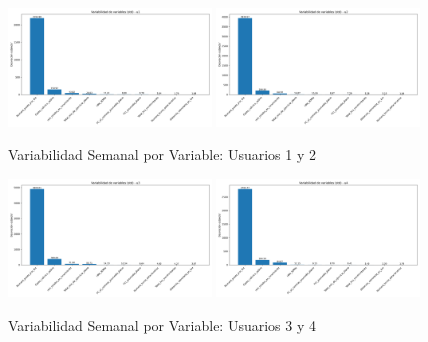 \documentclass[12pt,letterpaper,twoside]{report}
\begin{document}
\begin{figure}[H]
\centering
\includegraphics[width=0.48\textwidth]{figuras/variabilidad_variables_u1.png}
\includegraphics[width=0.48\textwidth]{figuras/variabilidad_variables_u2.png}
\caption{Variabilidad Semanal por Variable: Usuarios 1 y 2}
\end{figure}

\begin{figure}[H]
\centering
\includegraphics[width=0.48\textwidth]{figuras/variabilidad_variables_u3.png}
\includegraphics[width=0.48\textwidth]{figuras/variabilidad_variables_u4.png}
\caption{Variabilidad Semanal por Variable: Usuarios 3 y 4}
\end{figure}
\end{document}

